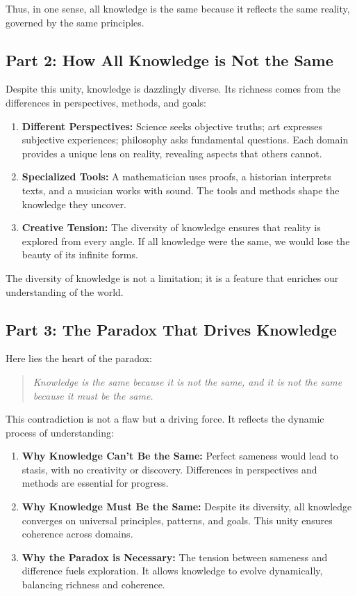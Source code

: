 \documentclass[12pt]{article}
\begin{document}
Thus, in one sense, all knowledge is the same because it reflects the same reality, governed by the same principles.

\subsection*{Part 2: How All Knowledge is Not the Same}
Despite this unity, knowledge is dazzlingly diverse. Its richness comes from the differences in perspectives, methods, and goals:
\begin{enumerate}
    \item \textbf{Different Perspectives:} Science seeks objective truths; art expresses subjective experiences; philosophy asks fundamental questions. Each domain provides a unique lens on reality, revealing aspects that others cannot.
    
    \item \textbf{Specialized Tools:} A mathematician uses proofs, a historian interprets texts, and a musician works with sound. The tools and methods shape the knowledge they uncover.
    
    \item \textbf{Creative Tension:} The diversity of knowledge ensures that reality is explored from every angle. If all knowledge were the same, we would lose the beauty of its infinite forms.
\end{enumerate}

The diversity of knowledge is not a limitation; it is a feature that enriches our understanding of the world.

\subsection*{Part 3: The Paradox That Drives Knowledge}
Here lies the heart of the paradox:
\begin{quote}
\textit{Knowledge is the same because it is not the same, and it is not the same because it must be the same.}
\end{quote}
This contradiction is not a flaw but a driving force. It reflects the dynamic process of understanding:
\begin{enumerate}
    \item \textbf{Why Knowledge Can't Be the Same:} Perfect sameness would lead to stasis, with no creativity or discovery. Differences in perspectives and methods are essential for progress.
    
    \item \textbf{Why Knowledge Must Be the Same:} Despite its diversity, all knowledge converges on universal principles, patterns, and goals. This unity ensures coherence across domains.
    
    \item \textbf{Why the Paradox is Necessary:} The tension between sameness and difference fuels exploration. It allows knowledge to evolve dynamically, balancing richness and coherence.
\end{enumerate}
\end{document}
